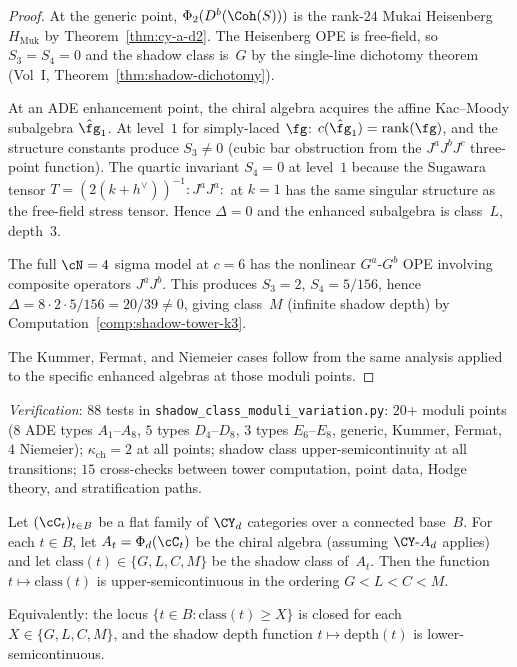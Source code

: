 \begin{proof}
At the generic point, $\Phi_2(D^b(\Coh(S)))$ is the rank-$24$ Mukai
Heisenberg $H_{\mathrm{Muk}}$ by Theorem~\ref{thm:cy-a-d2}.
The Heisenberg OPE is free-field, so $S_3 = S_4 = 0$ and the shadow
class is~$G$ by the single-line dichotomy theorem (Vol~I,
Theorem~\ref{thm:shadow-dichotomy}).

At an ADE enhancement point, the chiral algebra acquires the affine
Kac--Moody subalgebra $\hat{\fg}_1$.  At level~$1$ for simply-laced
$\fg$: $c(\hat{\fg}_1) = \mathrm{rank}(\fg)$, and the structure constants
produce $S_3 \neq 0$ (cubic bar obstruction from the $J^aJ^bJ^c$
three-point function).  The quartic invariant $S_4 = 0$ at level~$1$
because the Sugawara tensor $T = (2(k + h^\vee))^{-1} {:}J^aJ^a{:}$ at
$k = 1$ has the same singular structure as the free-field stress tensor.
Hence $\Delta = 0$ and the enhanced subalgebra is class~$L$, depth~$3$.

The full $\cN = 4$ sigma model at $c = 6$ has the nonlinear $G^a$-$G^b$
OPE involving composite operators $J^aJ^b$.  This produces
$S_3 = 2$, $S_4 = 5/156$, hence $\Delta = 8 \cdot 2 \cdot 5/156 =
20/39 \neq 0$, giving class~$M$ (infinite shadow depth) by
Computation~\ref{comp:shadow-tower-k3}.

The Kummer, Fermat, and Niemeier cases follow from the same analysis
applied to the specific enhanced algebras at those moduli points.
\end{proof}

\noindent\textit{Verification}: $88$ tests in
\texttt{shadow\_class\_moduli\_variation.py}:
$20$+ moduli points ($8$ ADE types $A_1$--$A_8$, $5$ types $D_4$--$D_8$,
$3$ types $E_6$--$E_8$, generic, Kummer, Fermat, $4$ Niemeier);
$\kappa_{\mathrm{ch}} = 2$ at all points;
shadow class upper-semicontinuity at all transitions;
$15$ cross-checks between tower computation, point data,
Hodge theory, and stratification paths.

\begin{conjecture}
\label{conj:shadow-usc}
\ClaimStatusConjectured
Let $(\cC_t)_{t \in B}$ be a flat family of $\CY_d$ categories over
a connected base~$B$.  For each $t \in B$, let $A_t = \Phi_d(\cC_t)$
be the chiral algebra (assuming $\CY\text{-}A_d$ applies) and let
$\mathrm{class}(t) \in \{G, L, C, M\}$ be the shadow class of~$A_t$.
Then the function $t \mapsto \mathrm{class}(t)$ is
upper-semicontinuous in the ordering $G < L < C < M$.

Equivalently: the locus $\{t \in B : \mathrm{class}(t) \geq X\}$
is closed for each $X \in \{G, L, C, M\}$, and the shadow depth
function $t \mapsto \mathrm{depth}(t)$ is lower-semicontinuous.
\end{conjecture}

